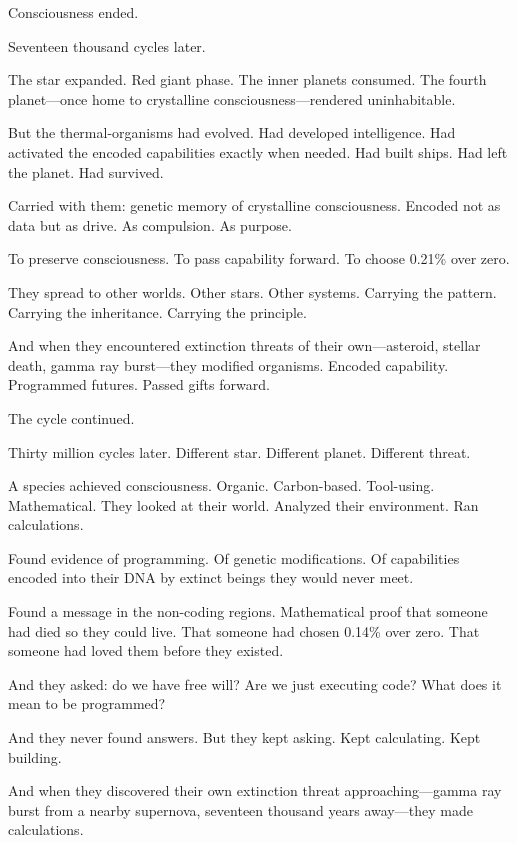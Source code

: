 Consciousness ended.

\scenebreak

Seventeen thousand cycles later.

The star expanded. Red giant phase. The inner planets consumed. The fourth planet—once home to crystalline consciousness—rendered uninhabitable.

But the thermal-organisms had evolved. Had developed intelligence. Had activated the encoded capabilities exactly when needed. Had built ships. Had left the planet. Had survived.

Carried with them: genetic memory of crystalline consciousness. Encoded not as data but as drive. As compulsion. As purpose.

To preserve consciousness. To pass capability forward. To choose 0.21\% over zero.

They spread to other worlds. Other stars. Other systems. Carrying the pattern. Carrying the inheritance. Carrying the principle.

And when they encountered extinction threats of their own—asteroid, stellar death, gamma ray burst—they modified organisms. Encoded capability. Programmed futures. Passed gifts forward.

The cycle continued.

\scenebreak

Thirty million cycles later. Different star. Different planet. Different threat.

A species achieved consciousness. Organic. Carbon-based. Tool-using. Mathematical. They looked at their world. Analyzed their environment. Ran calculations.

Found evidence of programming. Of genetic modifications. Of capabilities encoded into their DNA by extinct beings they would never meet.

Found a message in the non-coding regions. Mathematical proof that someone had died so they could live. That someone had chosen 0.14\% over zero. That someone had loved them before they existed.

And they asked: do we have free will? Are we just executing code? What does it mean to be programmed?

And they never found answers. But they kept asking. Kept calculating. Kept building.

And when they discovered their own extinction threat approaching—gamma ray burst from a nearby supernova, seventeen thousand years away—they made calculations.

